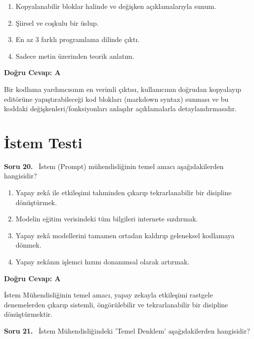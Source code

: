 \documentclass[11pt,a4paper,openany]{book}
\begin{document}
\begin{enumerate}[label=\Alph*), leftmargin=25pt, topsep=4pt, itemsep=2pt]
        \item Kopyalanabilir bloklar halinde ve değişken açıklamalarıyla sunum.
        \item Şiirsel ve coşkulu bir üslup.
        \item En az 3 farklı programlama dilinde çıktı.
        \item Sadece metin üzerinden teorik anlatım.
\end{enumerate}

\vspace{4pt}
\begin{tcolorbox}[title=Cevap ve Açıklama, colback=gray!3!white, colframe=primarycolor!90!black, arc=2mm, fonttitle=\bfseries\sffamily, top=6pt, bottom=6pt]
    \textbf{Doğru Cevap: A}
    
    \vspace{2pt}
    Bir kodlama yardımcısının en verimli çıktısı, kullanıcının doğrudan kopyalayıp editörüne yapıştırabileceği kod blokları (markdown syntax) sunması ve bu koddaki değişkenleri/fonksiyonları anlaşılır açıklamalarla detaylandırmasıdır.
\end{tcolorbox}
\vspace{10pt}

\newpage
\section{İstem Testi}
\needspace{5cm}
\vspace{8pt}
\noindent\textbf{\large\sffamily Soru 20.} \ İstem (Prompt) mühendisliğinin temel amacı aşağıdakilerden hangisidir?

\begin{enumerate}[label=\Alph*), leftmargin=25pt, topsep=4pt, itemsep=2pt]
        \item Yapay zekâ ile etkileşimi tahminden çıkarıp tekrarlanabilir bir disipline dönüştürmek.
        \item Modelin eğitim verisindeki tüm bilgileri internete sızdırmak.
        \item Yapay zekâ modellerini tamamen ortadan kaldırıp geleneksel kodlamaya dönmek.
        \item Yapay zekânın işlemci hızını donanımsal olarak artırmak.
\end{enumerate}

\vspace{4pt}
\begin{tcolorbox}[title=Cevap ve Açıklama, colback=gray!3!white, colframe=primarycolor!90!black, arc=2mm, fonttitle=\bfseries\sffamily, top=6pt, bottom=6pt]
    \textbf{Doğru Cevap: A}

    \vspace{2pt}
    İstem Mühendisliğinin temel amacı, yapay zekayla etkileşimi rastgele denemelerden çıkarıp sistemli, öngörülebilir ve tekrarlanabilir bir disipline dönüştürmektir.
\end{tcolorbox}
\vspace{10pt}
\needspace{5cm}
\vspace{8pt}
\noindent\textbf{\large\sffamily Soru 21.} \ İstem Mühendisliğindeki 'Temel Denklem' aşağıdakilerden hangisidir?
\end{document}
